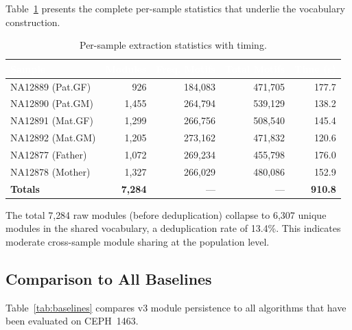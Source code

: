 \documentclass{../yalumba}
\begin{document}
Table~\ref{tab:sample-stats} presents the complete per-sample statistics
that underlie the vocabulary construction.

\begin{table}[H]
\centering
\tablestyle
\caption{Per-sample extraction statistics with timing.}
\label{tab:sample-stats}
\begin{tabular}{@{}lrrrr@{}}
\toprule
\rowcolor{table-header}
\textcolor{white}{\textbf{Sample}} &
\textcolor{white}{\textbf{Modules}} &
\textcolor{white}{\textbf{Freq. Motifs}} &
\textcolor{white}{\textbf{Total Motifs}} &
\textcolor{white}{\textbf{Time (s)}} \\
\midrule
NA12889 (Pat.GF) &   926 & 184{,}083 & 471{,}705 & 177.7 \\
NA12890 (Pat.GM) & 1{,}455 & 264{,}794 & 539{,}129 & 138.2 \\
NA12891 (Mat.GF) & 1{,}299 & 266{,}756 & 508{,}540 & 145.4 \\
NA12892 (Mat.GM) & 1{,}205 & 273{,}162 & 471{,}832 & 120.6 \\
NA12877 (Father) & 1{,}072 & 269{,}234 & 455{,}798 & 176.0 \\
NA12878 (Mother) & 1{,}327 & 266{,}029 & 480{,}086 & 152.9 \\
\midrule
\textbf{Totals} & \textbf{7{,}284} & --- & --- & \textbf{910.8} \\
\bottomrule
\end{tabular}
\end{table}

The total 7{,}284 raw modules (before deduplication) collapse to 6{,}307
unique modules in the shared vocabulary, a deduplication rate of 13.4\%.  This
indicates moderate cross-sample module sharing at the population level.

\subsection{Comparison to All Baselines}

Table~\ref{tab:baselines} compares v3 module persistence to all algorithms
that have been evaluated on CEPH~1463.
\end{document}
